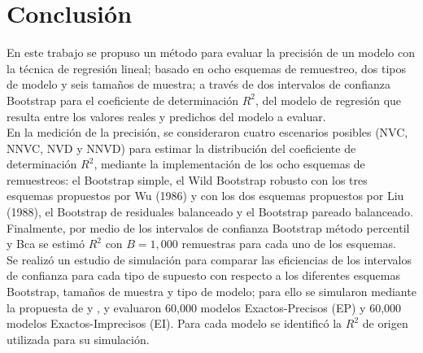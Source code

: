 \section{Conclusión}

En este trabajo se propuso un método para evaluar la precisión de un modelo con la técnica de regresión lineal; basado en ocho esquemas de remuestreo, dos tipos de modelo y seis tamaños de muestra; a través de dos intervalos de confianza Bootstrap para el coeficiente de determinación $R^2$, del modelo de regresión que resulta entre los valores reales y predichos del modelo a evaluar.\\

En la medición de la precisión, se consideraron cuatro escenarios posibles (NVC, NNVC, NVD y NNVD) para estimar la distribución del coeficiente de determinación $R^2$, mediante la implementación de los ocho esquemas de remuestreos: el Bootstrap simple, el Wild Bootstrap robusto con los tres esquemas propuestos por Wu (1986) y con los dos esquemas propuestos por Liu (1988), el Bootstrap de residuales balanceado y el Bootstrap pareado balanceado. Finalmente, por medio de los intervalos de confianza Bootstrap método percentil y Bca se estimó $R^2$ con $B=1,000$ remuestras para cada uno de los esquemas.\\

Se realizó un estudio de simulación para comparar las eficiencias de los intervalos de confianza para cada tipo de supuesto con respecto a los diferentes esquemas Bootstrap, tamaños de muestra y tipo de modelo; para ello se simularon mediante la propuesta de \textcite{febles-2014} y \textcite{zacarias-2023} , y evaluaron 60,000 modelos Exactos-Precisos (EP) y 60,000 modelos Exactos-Imprecisos (EI). Para cada modelo se identificó la $R^2$ de origen utilizada para su simulación.\\


